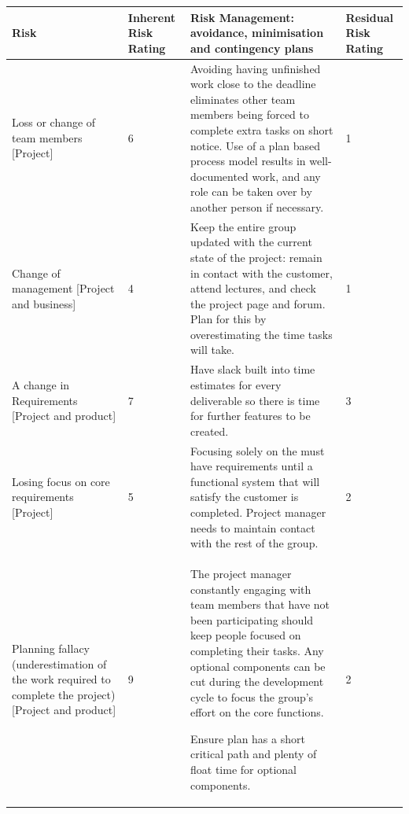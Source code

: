 \documentclass[]{IEEEtran}
\begin{document}
	\begin{table}[h]
	
	\begin{tabular}{| m{4cm} | m{1cm} | m{9.5cm} | m{1.5cm} | }
	
		\hline
		
		Risk & Inherent Risk Rating & Risk Management: avoidance, minimisation and contingency plans & Residual Risk Rating \\ 
		
		\hline
		
		Loss or change of team members [Project] & 
		6 & 
		Avoiding having unfinished work close to the deadline eliminates other team members being forced to complete extra tasks on short notice. Use of a plan based process model results in well-documented work, and any role can be taken over by another person if necessary. &
		1 \\
		
		\hline
		
		Change of management [Project and business] & 
		4 & 
		Keep the entire group updated with the current state of the project: remain in contact with the customer, attend lectures, and check the project page and forum. Plan for this by overestimating the time tasks will take. & 
		1 \\
		
		\hline
		
		A change in Requirements [Project and product] & 
		7 & 
		Have slack built into time estimates for every deliverable so there is time for further features to be created. & 
		3 \\
		
		\hline
		
		Losing focus on core requirements [Project] & 
		5 & 
		Focusing solely on the must have requirements until a functional system that will satisfy the customer is completed. Project manager needs to maintain contact with the rest of the group. & 
		2 \\
		
		\hline
		
		Planning fallacy (underestimation of the work required to complete the project) [Project and product] & 
		9 & 
		The project manager constantly engaging with team members that have not been participating should keep people focused on completing their tasks. Any optional components can be cut during the development cycle to focus the group's effort on the core functions.
		
		 Ensure plan has a short critical path and plenty of float time for optional components. & 
		2 \\
		

\end{tabular}
\end{table}
\end{document}
